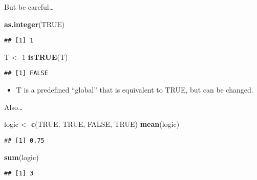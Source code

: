 \documentclass[ignorenonframetext,]{beamer}
\newenvironment{Shaded}{\begin{snugshade}}{\end{snugshade}}
\newcommand{\KeywordTok}[1]{\textcolor[rgb]{0.13,0.29,0.53}{\textbf{#1}}}
\newcommand{\DecValTok}[1]{\textcolor[rgb]{0.00,0.00,0.81}{#1}}
\newcommand{\StringTok}[1]{\textcolor[rgb]{0.31,0.60,0.02}{#1}}
\newcommand{\OtherTok}[1]{\textcolor[rgb]{0.56,0.35,0.01}{#1}}
\newcommand{\NormalTok}[1]{#1}
\providecommand{\tightlist}{%
	\setlength{\itemsep}{0pt}\setlength{\parskip}{0pt}}
\begin{document}
\begin{frame}[fragile]{But be careful\ldots{}}

\begin{Shaded}
\begin{Highlighting}[]
\KeywordTok{as.integer}\NormalTok{(}\OtherTok{TRUE}\NormalTok{)}
\end{Highlighting}
\end{Shaded}

\begin{verbatim}
## [1] 1
\end{verbatim}

\begin{Shaded}
\begin{Highlighting}[]
\NormalTok{T <-}\StringTok{ }\DecValTok{1}
\KeywordTok{isTRUE}\NormalTok{(T)}
\end{Highlighting}
\end{Shaded}

\begin{verbatim}
## [1] FALSE
\end{verbatim}

\begin{itemize}
\tightlist
\item
  T is a predefined ``global'' that is equivalent to TRUE, but can be
  changed.
\end{itemize}

\end{frame}

\begin{frame}[fragile]{Also\ldots{}}

\begin{Shaded}
\begin{Highlighting}[]
\NormalTok{logic <-}\StringTok{ }\KeywordTok{c}\NormalTok{(}\OtherTok{TRUE}\NormalTok{, }\OtherTok{TRUE}\NormalTok{, }\OtherTok{FALSE}\NormalTok{, }\OtherTok{TRUE}\NormalTok{)}
\KeywordTok{mean}\NormalTok{(logic)}
\end{Highlighting}
\end{Shaded}

\begin{verbatim}
## [1] 0.75
\end{verbatim}

\begin{Shaded}
\begin{Highlighting}[]
\KeywordTok{sum}\NormalTok{(logic)}
\end{Highlighting}
\end{Shaded}

\begin{verbatim}
## [1] 3
\end{verbatim}

\end{frame}
\end{document}
